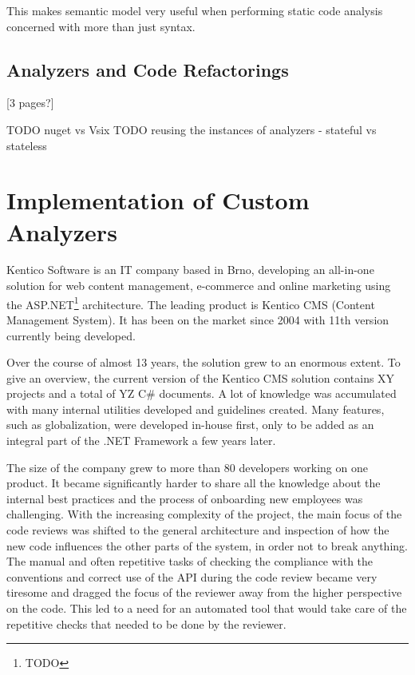 \documentclass[
  digital, %
  table,   %
  lof,     %
  lot,     %
  oneside,
]{fithesis3}
\begin{document}
This makes semantic model very useful when performing static code analysis concerned with more than just syntax.
 
\pagebreak
\section{Analyzers and Code Refactorings}
[3 pages?]
  

TODO nuget vs Vsix
TODO reusing the instances of analyzers - stateful vs stateless

\chapter{Implementation of Custom Analyzers}
\label{chap:custom-roslyn-analyzers}
Kentico Software is an IT company based in Brno, developing an all-in-one solution for web content management, e-commerce and online marketing using the ASP.NET\footnote{TODO} architecture. The leading product is Kentico CMS (Content Management System). It has been on the market since 2004 with 11th version currently being developed. 


Over the course of almost 13 years, the solution grew to an enormous extent. To give an overview, the current version of the Kentico CMS solution contains XY projects and a total of YZ C\# documents. A lot of knowledge was accumulated with many internal utilities developed and guidelines created. Many features, such as globalization, were developed in-house first, only to be added as an integral part of the .NET Framework a few years later.

The size of the company grew to more than 80 developers working on one product. It became significantly harder to share all the knowledge about the internal best practices and the process of onboarding new employees was challenging. With the increasing complexity of the project, the main focus of the code reviews was shifted to the general architecture and inspection of how the new code influences the other parts of the system, in order not to break anything. The manual and often repetitive tasks of checking the compliance with the conventions and correct use of the API during the code review became very tiresome and dragged the focus of the reviewer away from the higher perspective on the code. This led to a need for an automated tool that would take care of the repetitive checks that needed to be done by the reviewer.
\end{document}

